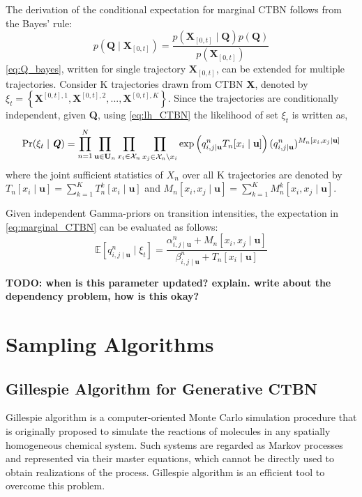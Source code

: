 The derivation of the conditional expectation for marginal CTBN follows from the Bayes' rule:
\begin{equation}
p\left(\textbf{Q} \mid \textbf{X}_{[0,t]}\right)=\frac{p\left(\textbf{X}_{[0,t]} \mid \textbf{Q}\right) p(\textbf{Q})}{p\left(\textbf{X}_{[0,t]}\right)}
\label{eq:Q_bayes}
\end{equation}
\autoref{eq:Q_bayes}, written for single trajectory $ \textbf{X}_{[0,t]} $, can be extended for multiple trajectories. Consider K trajectories drawn from CTBN \textbf{X}, denoted by $ \xi_t = \left\lbrace \textbf{X}^{[0,t], 1}, \textbf{X}^{[0,t], 2}, ..., \textbf{X}^{[0,t], K} \right\rbrace  $. Since the trajectories are conditionally independent, given \textbf{Q}, using \autoref{eq:lh_CTBN} the likelihood of set $ \xi_t $ is written as,
\begin{align}
\operatorname{Pr}( \xi_t  \mid \textbf{\textit{Q}} ) = \prod_{n=1}^{N} \prod_{\textbf{u} \in \mathcal{\textbf{U}}_{n}} \prod_{x_i \in \mathcal{X}_{n}} \prod_{x_j \in \mathcal{X}_{n} \backslash x_i}
\exp \left( q_{i,j\mid \textbf{u}}^{n} T_{n}[x_i\mid \textbf{u}]\right) (q_{i,j\mid \textbf{u}}^{n})^{M_{n}[x_i, x_j\mid \textbf{u}]}
\label{eq:lh_dataset_CTBN}
\end{align}
where the joint sufficient statistics of $ X_n $ over all K trajectories are denoted by  $ T_{n}[x_i\mid \textbf{u}] = \sum_{k=1}^{K} T_{n}^k[x_i\mid \textbf{u}] $ and $ M_{n}[x_i, x_j\mid \textbf{u}] =\sum_{k=1}^{K} M_{n}^k[x_i, x_j\mid \textbf{u}]$.

Given independent Gamma-priors on transition intensities, the expectation in \autoref{eq:marginal_CTBN} can be evaluated as follows:
\begin{equation}
	\mathbb{E}\left[q_{i,j\mid \textbf{u}}^{n} \mid \xi_{t}\right]=\frac{\alpha^n_{i,j\mid \textbf{u}}+M_{n}[x_i, x_j\mid \textbf{u}]}{\beta^n_{i,j\mid \textbf{u}}+T_{n}[x_i \mid \textbf{u}]}
	\label{eq:estimated_Q}
\end{equation}

\textbf{TODO: when is this parameter updated? explain. write about the dependency problem, how is this okay?}

\section{Sampling Algorithms}
\label{sec:sampling_alg}
\subsection{Gillespie Algorithm for Generative CTBN}
Gillespie algorithm is a computer-oriented Monte Carlo simulation procedure that is originally proposed to simulate the reactions of molecules in any spatially homogeneous chemical system. Such systems are regarded as Markov processes and represented via their master equations, which cannot be directly used to obtain realizations of the process. Gillespie algorithm is an efficient tool to overcome this problem. \cite{Gillespie1976}

